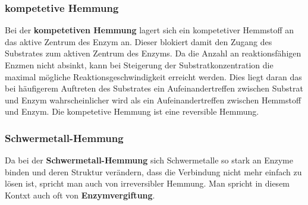 \documentclass{article}
\begin{document}
        \subsubsection{kompetetive Hemmung}
        Bei der \textbf{kompetetiven Hemmung} lagert sich ein kompetetiver Hemmstoff an das aktive Zentrum des Enzym an.
        Dieser blokiert damit den Zugang des Substrates zum aktiven Zentrum des Enzyms.
        Da die Anzahl an reaktionsfähigen Enzmen nicht absinkt, kann bei Steigerung der Substratkonzentration die maximal mögliche Reaktionsgeschwindigkeit erreicht werden.
        Dies liegt daran das bei häufigerem Auftreten des Substrates ein Aufeinandertreffen zwischen Substrat und Enzym wahrscheinlicher wird als ein Aufeinandertreffen zwischen Hemmstoff und Enzym.
        Die kompetetive Hemmung ist eine reversible Hemmung.
        \filbreak
        \subsubsection{Schwermetall-Hemmung}
        Da bei der \textbf{Schwermetall-Hemmung} sich Schwermetalle so stark an Enzyme binden und deren Struktur verändern, dass die Verbindung nicht mehr einfach zu lösen ist, spricht man auch von irreversibler Hemmung.
        Man spricht in diesem Kontxt auch oft von \textbf{Enzymvergiftung}.
    \filbreak
\end{document}

